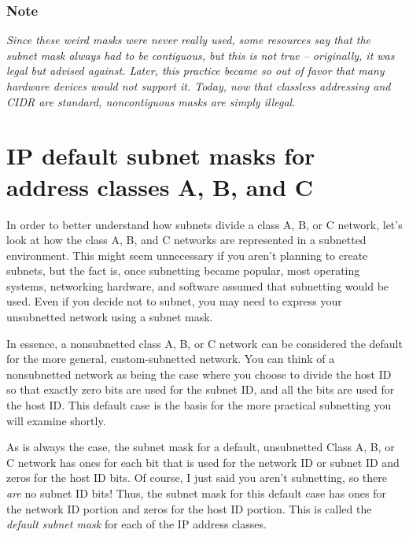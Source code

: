 \documentclass[b5paper,11pt]{memoir}
\begin{document}
\subsubsection[Note]{\texorpdfstring{\protect\hypertarget{ch18s03.htmlux5cux23note-70}{}{}Note}{Note}}

{\emph{Since these weird masks were never really used, some resources
say that the subnet mask always had to be contiguous, but this is not
true -- originally, it was legal but advised against. Later, this
practice became so out of favor that many hardware devices would not
support it. Today, now that classless addressing and CIDR are standard,
noncontiguous masks are simply
illegal}}\protect\hypertarget{ch18s03.htmlux5cux23idx-CHP-18-0732}{}{}.




\section{IP default subnet masks for address classes A, B, and C}

In order to better understand how subnets divide a class A, B, or C network, let's
look at how the class A, B, and C networks are represented in a
subnetted environment. This might seem unnecessary if you aren't
planning to create subnets, but the fact is, once subnetting became
popular, most operating systems, networking hardware, and software
assumed that subnetting would be used. Even if you decide not to subnet,
you may need to express your unsubnetted network using a subnet mask.

In essence, a nonsubnetted class A, B, or C network can be considered
the default for the more general, custom-subnetted network. You can
think of a nonsubnetted network as being the case where you choose to
divide the host ID so that exactly zero bits are used for the subnet ID,
and all the bits are used for the host ID. This default case is the
basis for the more practical subnetting you will examine shortly.

As is always the case, the subnet mask for a default, unsubnetted Class
A, B, or C network has ones for each bit that is used for the network ID
or subnet ID and zeros for the host ID bits. Of course, I just said you
aren't subnetting, so there {\emph{are}} no subnet ID bits! Thus, the
subnet mask for this default case has ones for the network ID portion
and zeros for the host ID portion. This is called the {\emph{default
subnet mask}} for each of the IP address classes.
\end{document}
